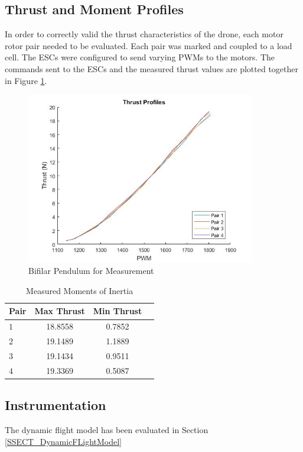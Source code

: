 		\subsection{Thrust and Moment Profiles}
		In order to correctly valid the thrust characteristics of the drone, each motor rotor pair needed to be evaluated. Each pair was marked and coupled to a load cell. The ESCs were configured to send varying PWMs to the motors. The commands sent to the ESCs and the measured thrust values are plotted together in Figure \ref{IM_ThrustProfiles}.
		
		\begin{figure}[H]
			\centering
			\includegraphics[height = 7.5cm]{../Design/Mechanical/ThrustProfiles/thrustprofiles.jpg}
			\caption{Bifilar Pendulum for Measurement}
			\label{IM_ThrustProfiles}
		\end{figure}
		
		\begin{table}[!]
			\centering
			\begin{tabular}{l | c | c | c |}
				Pair & Max Thrust & Min Thrust\\
				\hline\hline
				$1$ & 18.8558 & 0.7852\\
				$2$ & 19.1489 & 1.1889\\
				$3$ & 19.1434 & 0.9511\\
				$4$ & 19.3369 & 0.5087\\
			\end{tabular}
			\label{TAB_ThrustProfiles}
			\caption{Measured Moments of Inertia}
		\end{table}
		
		
		\subsection{Instrumentation}
		The dynamic flight model has been evaluated in Section \ref{SSECT_DynamicFLightModel}
